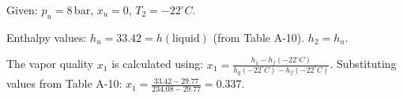 Given:  
\( p_u = 8 \, \text{bar} \), \( x_u = 0 \), \( T_2 = -22^\circ C \).  

Enthalpy values:  
\( h_u = 33.42 = h(\text{liquid}) \) (from Table A-10).  
\( h_2 = h_u \).  

The vapor quality \( x_1 \) is calculated using:  
\( x_1 = \frac{h_1 - h_f(-22^\circ C)}{h_g(-22^\circ C) - h_f(-22^\circ C)} \).  
Substituting values from Table A-10:  
\( x_1 = \frac{33.42 - 29.77}{234.08 - 29.77} = 0.337 \).